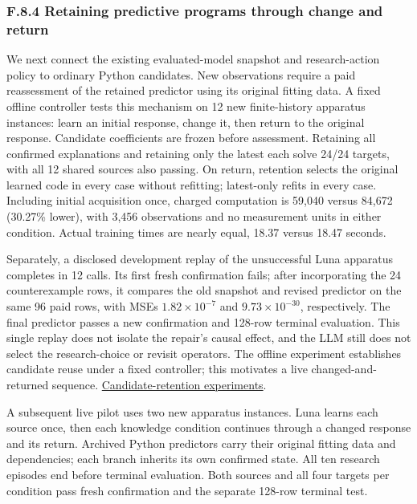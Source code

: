 \documentclass[11pt,a4paper]{article}
\begin{document}
\subsubsection*{F.8.4 Retaining predictive programs through change and return}

We next connect the existing evaluated-model snapshot and research-action policy
to ordinary Python candidates. New observations require a paid reassessment of
the retained predictor using its original fitting data. A fixed offline controller
tests this mechanism on 12 new finite-history apparatus instances: learn an initial
response, change it, then return to the original response. Candidate coefficients
are frozen before assessment. Retaining all confirmed explanations and retaining
only the latest each solve 24/24 targets, with all 12 shared sources also passing.
On return, retention selects the original learned code in every case without
refitting; latest-only refits in every case. Including initial acquisition once,
charged computation is 59,040 versus 84,672 (30.27\% lower), with 3,456 observations
and no measurement units in either condition. Actual training times are nearly
equal, 18.37 versus 18.47 seconds.


Separately, a disclosed development replay of the unsuccessful Luna apparatus
completes in 12 calls. Its first fresh confirmation fails; after incorporating the
24 counterexample rows, it compares the old snapshot and revised predictor on
the same 96 paid rows, with MSEs \(1.82\times10^{-7}\) and \(9.73\times10^{-30}\),
respectively. The final predictor passes a new confirmation and 128-row terminal
evaluation. This single replay does not isolate the repair's causal effect, and
the LLM still does not select the research-choice or revisit operators. The
offline experiment establishes candidate reuse under a fixed controller;
this motivates a live changed-and-returned sequence.
\hyperlink{artifact-79}{Candidate-retention experiments}.


A subsequent live pilot uses two new apparatus instances. Luna learns each source
once, then each knowledge condition continues through a changed response and its
return. Archived Python predictors carry their original fitting data and dependencies;
each branch inherits its own confirmed state. All ten research episodes end before
terminal evaluation. Both sources and all four targets per condition pass fresh
confirmation and the separate 128-row terminal test.
\end{document}
